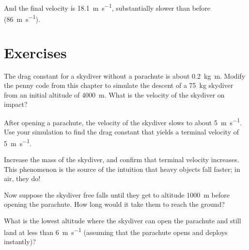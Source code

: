 \documentclass[
]{book}
\numberwithin{Answer}{chapter}
\numberwithin{Exercise}{chapter}
\begin{document}
And the final velocity is \SI{18.1}{\meter \per \second}, substantially slower than before (\SI{86}{\meter \per \second}).


%
%
%
%


\section{Exercises}


\begin{ex}
The drag constant for a skydiver without a parachute is about \SI{0.2}{\kilogram \meter}.  Modify the penny code from this chapter to simulate the descent of a \SI{75}{\kilogram} skydiver from an initial altitude of \SI{4000}{\meter}.  What is the velocity of the skydiver on impact?

After opening a parachute, the velocity of the skydiver slows to about \SI{5}{\meter\per\second}.  Use your simulation to find the drag constant that yields a terminal velocity of \SI{5}{\meter\per\second}.

Increase the mass of the skydiver, and confirm that terminal velocity increases.  This phenomenon is the source of the intuition that heavy objects fall faster; in air, they do!

Now suppose the skydiver free falls until they get to altitude \SI{1000}{\meter} before opening the parachute.  How long would it take them to reach the ground?

What is the lowest altitude where the skydiver can open the parachute and still land at less than \SI{6}{\meter\per\second} (assuming that the parachute opens and deploys instantly)?

\end{ex}
\end{document}
